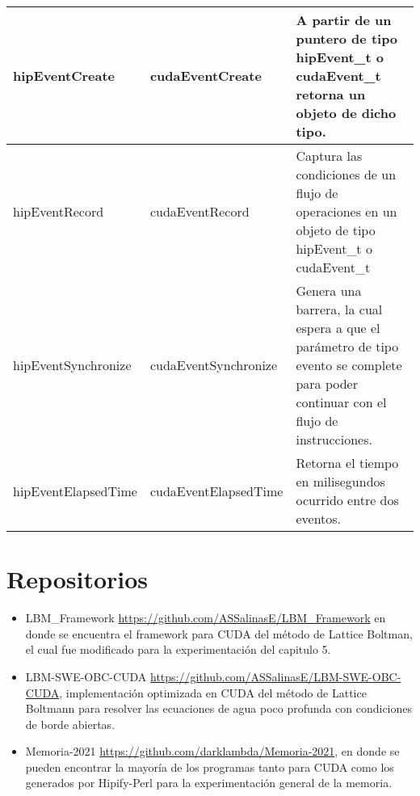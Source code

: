 \begin{table}[h!]
\begin{tabularx}{\textwidth}{|p{}|p{}|X|}
hipEventCreate        & cudaEventCreate        & A partir de un puntero de tipo hipEvent\_t o cudaEvent\_t retorna un objeto de dicho tipo.                                                                                                                                    \\ \hline
hipEventRecord        & cudaEventRecord        & Captura las condiciones de un flujo de operaciones en un objeto de tipo hipEvent\_t o cudaEvent\_t                                                                                                                            \\ \hline
hipEventSynchronize   & cudaEventSynchronize   & Genera una barrera, la cual espera a que el parámetro de tipo evento se complete para poder continuar con el flujo de instrucciones.                                                                                          \\ \hline
hipEventElapsedTime   & cudaEventElapsedTime   & Retorna el tiempo en milisegundos ocurrido entre dos eventos.                                                                                                                                                                 \\ \hline
\end{tabularx}
\end{table}

\newpage

\section{Repositorios}

\begin{itemize}
    \item LBM\_Framework \href{https://github.com/ASSalinasE/LBM_Framework}{https://github.com/ASSalinasE/LBM\_Framework} en donde se encuentra el framework para CUDA del método de Lattice Boltman, el cual fue modificado para la experimentación del capitulo 5.
    \item LBM-SWE-OBC-CUDA \href{http://www.overleaf.comhttps://github.com/ASSalinasE/LBM-SWE-OBC-CUDA}{https://github.com/ASSalinasE/LBM-SWE-OBC-CUDA}, implementación optimizada en CUDA del método de Lattice Boltmann para resolver las ecuaciones de agua poco profunda con condiciones de borde abiertas.
    \item Memoria-2021 \href{https://github.com/darklambda/Memoria-2021}{https://github.com/darklambda/Memoria-2021}, en donde se pueden encontrar la mayoría de los programas tanto para CUDA como los generados por Hipify-Perl para la experimentación general de la memoria.
\end{itemize}

